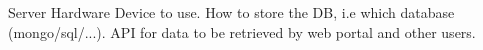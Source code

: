 Server Hardware
Device to use. How to store the DB, i.e which database (mongo/sql/...). API for data to be retrieved by web portal and other users.